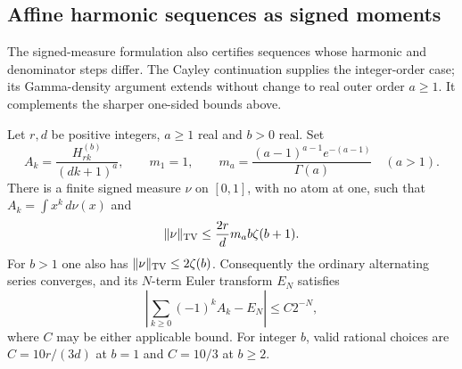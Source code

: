\subsection{Affine harmonic sequences as signed moments}
\label{affine:sec:moments}
The signed-measure formulation also certifies sequences whose harmonic and
denominator steps differ. The Cayley continuation supplies the integer-order
case; its Gamma-density argument extends without change to real outer order
$a\ge1$. It complements the sharper one-sided bounds above.

\begin{theorem}\label{affine:thm:moments}
Let $r,d$ be positive integers, $a\ge1$ real and $b>0$ real. Set
\[
 A_k=\frac{H_{rk}^{(b)}}{(dk+1)^a},\qquad
 m_1=1,\qquad m_a=\frac{(a-1)^{a-1}e^{-(a-1)}}{\Gamma(a)}\quad(a>1).
\]
There is a finite signed measure $\nu$ on $[0,1]$, with no atom at one,
such that $A_k=\int x^k\,d\nu(x)$ and
\[
 \|\nu\|_{\rm TV}\le\frac{2r}{d}m_a b\zeta(b+1).
\]
For $b>1$ one also has $\|\nu\|_{\rm TV}\le2\zeta(b)$.
Consequently the ordinary alternating series converges, and its $N$-term
Euler transform $E_N$ satisfies
\[
 \left|\sum_{k\ge0}(-1)^kA_k-E_N\right|\le C2^{-N},
\]
where $C$ may be either applicable bound. For integer $b$, valid rational
choices are $C=10r/(3d)$ at $b=1$ and $C=10/3$ at $b\ge2$.
\end{theorem}

